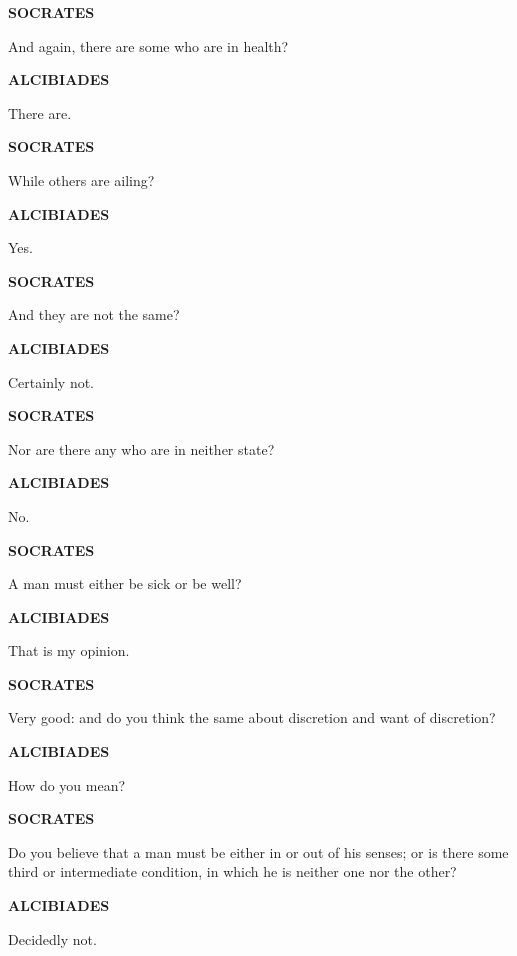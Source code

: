 \documentclass[11pt,letter]{article}
\begin{document}
\par \textbf{SOCRATES}
\par   And again, there are some who are in health?

\par \textbf{ALCIBIADES}
\par   There are.

\par \textbf{SOCRATES}
\par   While others are ailing?

\par \textbf{ALCIBIADES}
\par   Yes.

\par \textbf{SOCRATES}
\par   And they are not the same?

\par \textbf{ALCIBIADES}
\par   Certainly not.

\par \textbf{SOCRATES}
\par   Nor are there any who are in neither state?

\par \textbf{ALCIBIADES}
\par   No.

\par \textbf{SOCRATES}
\par   A man must either be sick or be well?

\par \textbf{ALCIBIADES}
\par   That is my opinion.

\par \textbf{SOCRATES}
\par   Very good:  and do you think the same about discretion and want of discretion?

\par \textbf{ALCIBIADES}
\par   How do you mean?

\par \textbf{SOCRATES}
\par   Do you believe that a man must be either in or out of his senses; or is there some third or intermediate condition, in which he is neither one nor the other?

\par \textbf{ALCIBIADES}
\par   Decidedly not.
\end{document}
